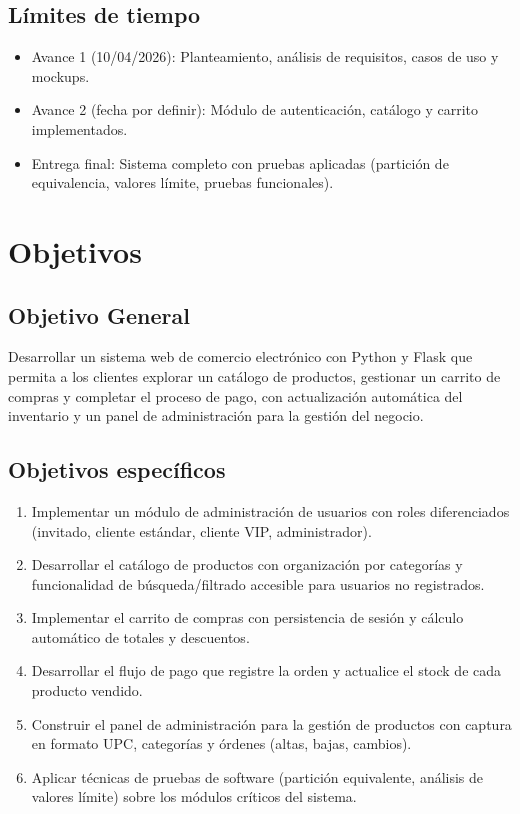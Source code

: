 \documentclass[12pt,a4paper]{article}
\begin{document}
\subsection{Límites de tiempo}
\begin{itemize}[label=--]
    \item Avance 1 (10/04/2026): Planteamiento, análisis de requisitos, casos de uso y mockups.
    \item Avance 2 (fecha por definir): Módulo de autenticación, catálogo y carrito implementados.
    \item Entrega final: Sistema completo con pruebas aplicadas (partición de equivalencia, valores límite, pruebas funcionales).
\end{itemize}


\section{Objetivos}

\subsection{Objetivo General}
Desarrollar un sistema web de comercio electrónico con Python y Flask que permita
a los clientes explorar un catálogo de productos, gestionar un carrito de compras y
completar el proceso de pago, con actualización automática del inventario y un
panel de administración para la gestión del negocio.

\subsection{Objetivos específicos}
\begin{enumerate}[label=OE\arabic*:]
    \item Implementar un módulo de administración de usuarios con roles diferenciados (invitado, cliente estándar, cliente VIP, administrador).
    \item Desarrollar el catálogo de productos con organización por categorías y funcionalidad de búsqueda/filtrado accesible para usuarios no registrados.
    \item Implementar el carrito de compras con persistencia de sesión y cálculo automático de totales y descuentos.
    \item Desarrollar el flujo de pago que registre la orden y actualice el stock de cada producto vendido.
    \item Construir el panel de administración para la gestión de productos con captura en formato UPC, categorías y órdenes (altas, bajas, cambios).
    \item Aplicar técnicas de pruebas de software (partición equivalente, análisis de valores límite) sobre los módulos críticos del sistema.
\end{enumerate}
\end{document}
